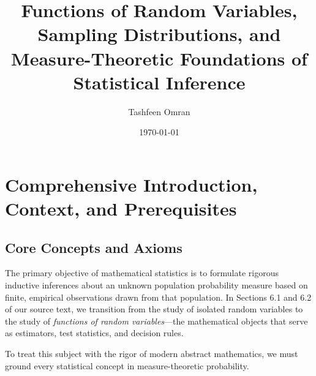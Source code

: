 \documentclass[11pt, letterpaper]{article}
\title{\textbf{Functions of Random Variables, Sampling Distributions, and Measure-Theoretic Foundations of Statistical Inference}}
\author{Tashfeen Omran}
\date{\today}
\theoremstyle{definition}
\theoremstyle{remark}
\begin{document}
\maketitle
\tableofcontents
\newpage

\section{Comprehensive Introduction, Context, and Prerequisites}

\subsection{Core Concepts and Axioms}

The primary objective of mathematical statistics is to formulate rigorous inductive inferences about an unknown population probability measure based on finite, empirical observations drawn from that population. In Sections 6.1 and 6.2 of our source text, we transition from the study of isolated random variables to the study of \emph{functions of random variables}—the mathematical objects that serve as estimators, test statistics, and decision rules.

To treat this subject with the rigor of modern abstract mathematics, we must ground every statistical concept in measure-theoretic probability.
\end{document}
